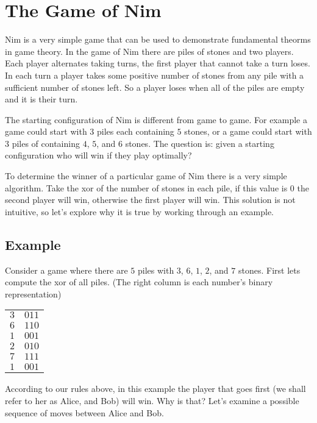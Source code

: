 
\section{The Game of Nim}

Nim is a very simple game that can be used to demonstrate fundamental theorms in game theory. In the game of Nim there are piles of stones and two players. Each player alternates taking turns, the first player that cannot take a turn loses. In each turn a player takes some positive number of stones from any pile with a sufficient number of stones left. So a player loses when all of the piles are empty and it is their turn.

The starting configuration of Nim is different from game to game. For example a game could start with $3$ piles each containing $5$ stones, or a game could start with $3$ piles of containing $4$, $5$, and $6$ stones. The question is: given a starting configuration who will win if they play optimally?

To determine the winner of a particular game of Nim there is a very simple algorithm. Take the xor of the number of stones in each pile, if this value is $0$ the second player will win, otherwise the first player will win. This solution is not intuitive, so let's explore why it is true by working through an example.

\subsection{Example}

Consider a game where there are $5$ piles with $3$, $6$, $1$, $2$, and $7$ stones. First lets compute the xor of all piles. (The right column is each number's binary representation)


\begin{center}
\begin{tabular}{r|l}
$3$ & $011$ \\
$6$ & $110$ \\
$1$ & $001$ \\
$2$ & $010$ \\
$7$ & $111$ \\
\hline
$1$ & $001$
\end{tabular}
\end{center}

According to our rules above, in this example the player that goes first (we shall refer to her as Alice, and Bob) will win. Why is that? Let's examine a possible sequence of moves between Alice and Bob.

